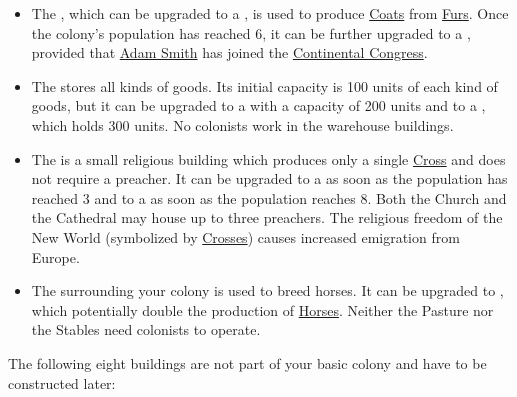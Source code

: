 \documentclass[12pt]{book}
\begin{document}
\begin{itemize}
\item The , which can be upgraded to a
  , is used to produce
  \hyperlink{Coats}{Coats} from \hyperlink{Furs}{Furs}. Once the
  colony's population has reached 6, it can be further upgraded to a
  , provided that \hyperlink{Adam Smith}{Adam
  Smith} has joined the \hyperlink{Continental Congress}{Continental
  Congress}.

\item The  stores all kinds of goods. Its initial
  capacity is 100 units of each kind of goods, but it can be upgraded
  to a  with a capacity of 200 units and to a
  , which holds 300 units. No colonists
  work in the warehouse buildings.

\item The  is a small religious building which
  produces only a single \hyperlink{Crosses}{Cross} and does not
  require a preacher. It can be upgraded to a  as
  soon as the population has reached 3 and to a 
  as soon as the population reaches 8. Both the Church and the
  Cathedral may house up to three preachers. The religious freedom of
  the New World (symbolized by \hyperlink{Crosses}{Crosses}) causes
  increased emigration from Europe.

\item The  surrounding your colony is used to breed
  horses. It can be upgraded to , which potentially
  double the production of \hyperlink{Horses}{Horses}. Neither the
  Pasture nor the Stables need colonists to operate.

\end{itemize}

The following eight buildings are not part of your basic colony and
have to be constructed later:
\end{document}
